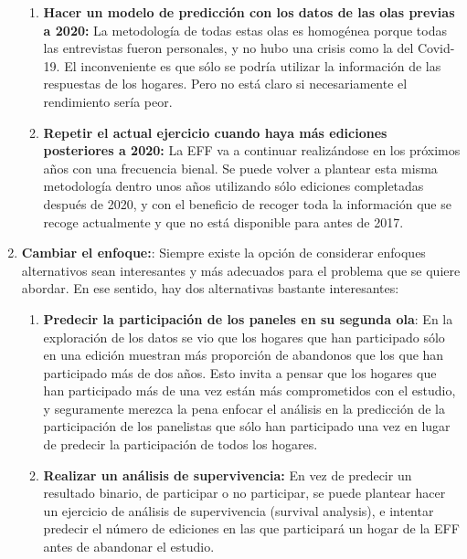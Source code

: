 \begin{enumerate}
\begin{enumerate}[noitemsep]
        \item \textbf{Hacer un modelo de predicción con los datos de las olas previas a 2020:} La metodología de todas estas olas es homogénea porque todas las entrevistas fueron personales, y no hubo una crisis como la del Covid-19. El inconveniente es que sólo se podría utilizar la información de las respuestas de los hogares. Pero no está claro si necesariamente el rendimiento sería peor.
        \item \textbf{Repetir el actual ejercicio cuando haya más ediciones posteriores a 2020:} La EFF va a continuar realizándose en los próximos años con una frecuencia bienal. Se puede volver a plantear esta misma metodología dentro unos años utilizando sólo ediciones completadas después de 2020, y con el beneficio de recoger toda la información que se recoge actualmente y que no está disponible para antes de 2017.
    \end{enumerate}
    \item\textbf{Cambiar el enfoque:}: Siempre existe la opción de considerar enfoques alternativos sean interesantes y más adecuados para el problema que se quiere abordar. En ese sentido, hay dos alternativas bastante interesantes:
    \begin{enumerate}[noitemsep]
        \item \textbf{Predecir la participación de los paneles en su segunda ola}: En la exploración de los datos se vio que los hogares que han participado sólo en una edición muestran más proporción de abandonos que los que han participado más de dos años. Esto invita a pensar que los hogares que han participado más de una vez están más comprometidos con el estudio, y seguramente merezca la pena enfocar el análisis en la predicción de la participación de los panelistas que sólo han participado una vez en lugar de predecir la participación de todos los hogares.
        \item \textbf{Realizar un análisis de supervivencia:} En vez de predecir un resultado binario, de participar o no participar, se puede plantear hacer un ejercicio de análisis de supervivencia (survival analysis), e intentar predecir el número de ediciones en las que participará un hogar de la EFF antes de abandonar el estudio.
    \end{enumerate}
\end{enumerate}